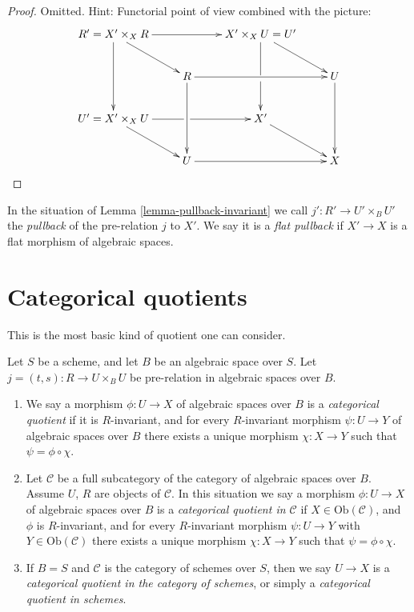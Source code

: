 \begin{proof}
Omitted. Hint: Functorial point of view combined with the picture:
$$
\xymatrix{
R' = X' \times_X R \ar[dd] \ar[rr] \ar[rd] &&
X' \times_X U = U' \ar'[d][dd] \ar[rd] \\
& R \ar[dd] \ar[rr] && U \ar[dd] \\
U' = X' \times_X U \ar'[r][rr] \ar[rd] && X' \ar[rd] \\
& U \ar[rr] && X
}
$$
\end{proof}

\begin{definition}
\label{definition-pullback}
In the situation of
Lemma \ref{lemma-pullback-invariant}
we call $j' : R' \to U' \times_B U'$ the {\it pullback} of the pre-relation
$j$ to $X'$. We say it is a {\it flat pullback} if $X' \to X$ is a flat
morphism of algebraic spaces.
\end{definition}





\section{Categorical quotients}
\label{section-categorical}

\noindent
This is the most basic kind of quotient one can consider.

\begin{definition}
\label{definition-categorical}
Let $S$ be a scheme, and let $B$ be an algebraic space over $S$.
Let $j = (t, s) : R \to U \times_B U$ be pre-relation in algebraic spaces
over $B$.
\begin{enumerate}
\item We say a morphism $\phi : U \to X$ of algebraic spaces over $B$
is a {\it categorical quotient} if it is $R$-invariant, and
for every $R$-invariant morphism $\psi : U \to Y$ of algebraic spaces over $B$
there exists a unique morphism $\chi : X \to Y$ such that
$\psi = \phi \circ \chi$.
\item Let $\mathcal{C}$ be a full subcategory of the category of algebraic
spaces over $B$. Assume $U$, $R$ are objects of $\mathcal{C}$.
In this situation we say
a morphism $\phi : U \to X$ of algebraic spaces over $B$
is a {\it categorical quotient in $\mathcal{C}$}
if $X \in \text{Ob}(\mathcal{C})$, and $\phi$ is $R$-invariant,
and for every $R$-invariant morphism
$\psi : U \to Y$ with $Y \in \text{Ob}(\mathcal{C})$
there exists a unique morphism $\chi : X \to Y$ such
that $\psi = \phi \circ \chi$.
\item If $B = S$ and $\mathcal{C}$ is the category of schemes over $S$,
then we say $U \to X$ is a
{\it categorical quotient in the category of schemes}, or simply a
{\it categorical quotient in schemes}.
\end{enumerate}
\end{definition}


